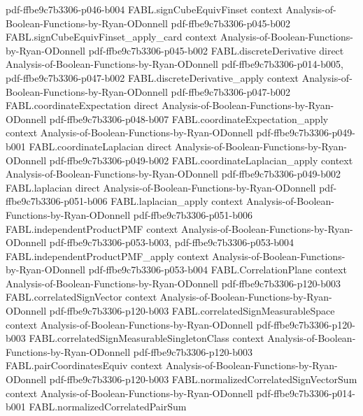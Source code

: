 \begin{theorem}
  {pdf-ffbe9c7b3306-p046-b004}
\proofstep
  {FABL.signCubeEquivFinset}
  {context}
  {Analysis-of-Boolean-Functions-by-Ryan-ODonnell}
  {pdf-ffbe9c7b3306-p045-b002}
\proofstep
  {FABL.signCubeEquivFinset_apply_card}
  {context}
  {Analysis-of-Boolean-Functions-by-Ryan-ODonnell}
  {pdf-ffbe9c7b3306-p045-b002}
\proofstep
  {FABL.discreteDerivative}
  {direct}
  {Analysis-of-Boolean-Functions-by-Ryan-ODonnell}
  {pdf-ffbe9c7b3306-p014-b005,
    pdf-ffbe9c7b3306-p047-b002}
\proofstep
  {FABL.discreteDerivative_apply}
  {context}
  {Analysis-of-Boolean-Functions-by-Ryan-ODonnell}
  {pdf-ffbe9c7b3306-p047-b002}
\proofstep
  {FABL.coordinateExpectation}
  {direct}
  {Analysis-of-Boolean-Functions-by-Ryan-ODonnell}
  {pdf-ffbe9c7b3306-p048-b007}
\proofstep
  {FABL.coordinateExpectation_apply}
  {context}
  {Analysis-of-Boolean-Functions-by-Ryan-ODonnell}
  {pdf-ffbe9c7b3306-p049-b001}
\proofstep
  {FABL.coordinateLaplacian}
  {direct}
  {Analysis-of-Boolean-Functions-by-Ryan-ODonnell}
  {pdf-ffbe9c7b3306-p049-b002}
\proofstep
  {FABL.coordinateLaplacian_apply}
  {context}
  {Analysis-of-Boolean-Functions-by-Ryan-ODonnell}
  {pdf-ffbe9c7b3306-p049-b002}
\proofstep
  {FABL.laplacian}
  {direct}
  {Analysis-of-Boolean-Functions-by-Ryan-ODonnell}
  {pdf-ffbe9c7b3306-p051-b006}
\proofstep
  {FABL.laplacian_apply}
  {context}
  {Analysis-of-Boolean-Functions-by-Ryan-ODonnell}
  {pdf-ffbe9c7b3306-p051-b006}
\proofstep
  {FABL.independentProductPMF}
  {context}
  {Analysis-of-Boolean-Functions-by-Ryan-ODonnell}
  {pdf-ffbe9c7b3306-p053-b003,
    pdf-ffbe9c7b3306-p053-b004}
\proofstep
  {FABL.independentProductPMF_apply}
  {context}
  {Analysis-of-Boolean-Functions-by-Ryan-ODonnell}
  {pdf-ffbe9c7b3306-p053-b004}
\proofstep
  {FABL.CorrelationPlane}
  {context}
  {Analysis-of-Boolean-Functions-by-Ryan-ODonnell}
  {pdf-ffbe9c7b3306-p120-b003}
\proofstep
  {FABL.correlatedSignVector}
  {context}
  {Analysis-of-Boolean-Functions-by-Ryan-ODonnell}
  {pdf-ffbe9c7b3306-p120-b003}
\proofstep
  {FABL.correlatedSignMeasurableSpace}
  {context}
  {Analysis-of-Boolean-Functions-by-Ryan-ODonnell}
  {pdf-ffbe9c7b3306-p120-b003}
\proofstep
  {FABL.correlatedSignMeasurableSingletonClass}
  {context}
  {Analysis-of-Boolean-Functions-by-Ryan-ODonnell}
  {pdf-ffbe9c7b3306-p120-b003}
\proofstep
  {FABL.pairCoordinatesEquiv}
  {context}
  {Analysis-of-Boolean-Functions-by-Ryan-ODonnell}
  {pdf-ffbe9c7b3306-p120-b003}
\proofstep
  {FABL.normalizedCorrelatedSignVectorSum}
  {context}
  {Analysis-of-Boolean-Functions-by-Ryan-ODonnell}
  {pdf-ffbe9c7b3306-p014-b001}
\proofstep
  {FABL.normalizedCorrelatedPairSum}

\end{theorem}
